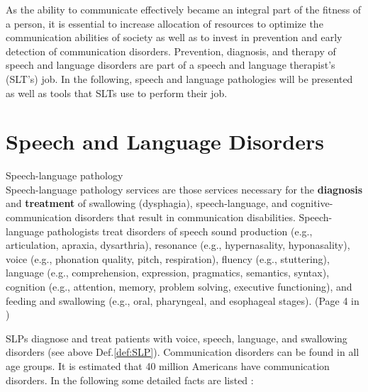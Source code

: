 As the ability to communicate effectively became an integral part of the fitness of a person, it is essential to increase allocation of resources to optimize the communication abilities of society as well as to invest in prevention and early detection of communication disorders. Prevention, diagnosis, and therapy of speech and language disorders are part of a speech and language therapist's (SLT's) job. In the following, speech and language pathologies will be presented as well as tools that SLTs use to perform their job.

\section{Speech and Language Disorders}
\label{sec:SLP}

\theoremstyle{definition}
\begin{definition}{Speech-language pathology\\}
Speech-language pathology services are those services necessary for the \textbf{diagnosis} and \textbf{treatment} of swallowing (dysphagia), speech-language, and cognitive-communication disorders that result in communication disabilities. Speech-language pathologists treat disorders of speech sound production (e.g., articulation, apraxia, dysarthria), resonance (e.g., hypernasality, hyponasality), voice (e.g., phonation quality, pitch, respiration), fluency (e.g., stuttering), language (e.g., comprehension, expression, pragmatics, semantics, syntax), cognition (e.g., attention, memory, problem solving, executive functioning), and feeding and swallowing (e.g., oral, pharyngeal, and esophageal stages). (Page 4 in \cite{SLPathologies})
\label{def:SLP}
\end{definition}

SLPs diagnose and treat patients with voice, speech, language, and swallowing disorders (see above Def.\ref{def:SLP}). Communication disorders can be found in all age groups. It is estimated that 40 million Americans have communication disorders. In the following some detailed facts are listed \cite{SLPathologies}:

